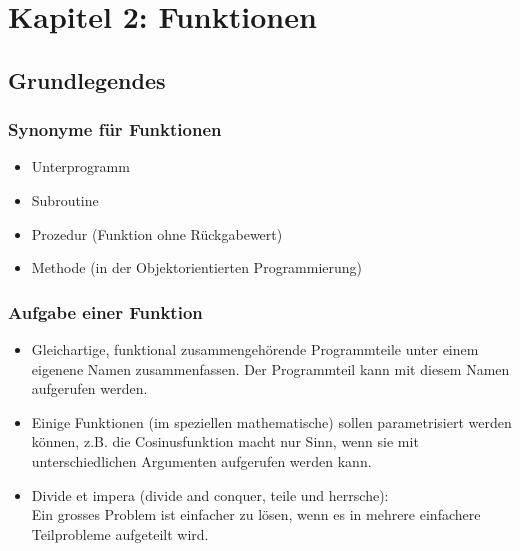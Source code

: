 
\section{Kapitel 2: Funktionen\hfill}
\label{sec:abschnitt}


\subsection{Grundlegendes\hfill}
\label{sec:unterabschnitt}

\subsubsection{Synonyme für Funktionen\hfill}
\label{sec:unterunterabschnitt}
\begin{itemize}
	\item Unterprogramm
	\item Subroutine
	\item Prozedur (Funktion ohne Rückgabewert)
	\item Methode (in der Objektorientierten Programmierung)
\end{itemize}

\subsubsection{Aufgabe einer Funktion\hfill}
\label{sec:unterunterabschnitt}
\begin{itemize}
	\item Gleichartige, funktional zusammengehörende Programmteile unter einem eigenene Namen zusammenfassen. Der Programmteil kann mit diesem Namen aufgerufen werden.
	\item Einige Funktionen (im speziellen mathematische) sollen parametrisiert werden können, z.B. die Cosinusfunktion macht nur Sinn, wenn sie mit unterschiedlichen Argumenten aufgerufen werden kann.
	\item Divide et impera (divide and conquer, teile und herrsche):
	\\ Ein grosses Problem ist einfacher zu lösen, wenn es in mehrere einfachere Teilprobleme aufgeteilt wird.
\end{itemize}

